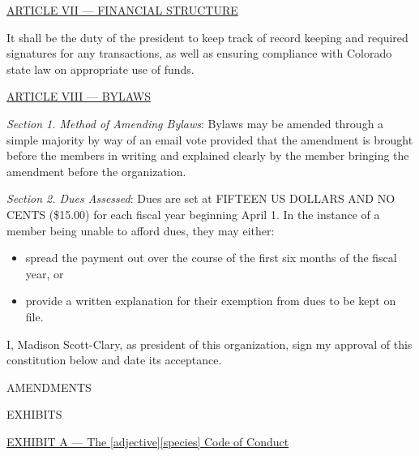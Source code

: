 \documentclass{article}
\begin{document}
\bigskip

\large{\underline{ARTICLE VII --- FINANCIAL STRUCTURE}}

It shall be the duty of the president to keep track of record keeping and required signatures for any transactions, as well as ensuring compliance with Colorado state law on appropriate use of funds.

\bigskip

\large{\underline{ARTICLE VIII --- BYLAWS}}

\emph{Section 1. Method of Amending Bylaws}: Bylaws may be amended through a simple majority by way of an email vote provided that the amendment is brought before the members in writing and explained clearly by the member bringing the amendment before the organization.

\emph{Section 2. Dues Assessed}: Dues are set at FIFTEEN US DOLLARS AND NO CENTS (\$15.00) for each fiscal year beginning April 1.  In the instance of a member being unable to afford dues, they may either:
\begin{itemize}
  \item spread the payment out over the course of the first six months of the fiscal year, or
  \item provide a written explanation for their exemption from dues to be kept on file.
\end{itemize}

\bigskip

I, Madison Scott-Clary, as president of this organization, sign my approval of this constitution below and date its acceptance.

\bigskip

\newpage

\begin{center}
\Huge{AMENDMENTS}
\end{center}

\newpage

\begin{center}
\Huge{EXHIBITS}
\end{center}

\large{\underline{EXHIBIT A --- The [adjective][species] Code of Conduct}}


\end{document}

